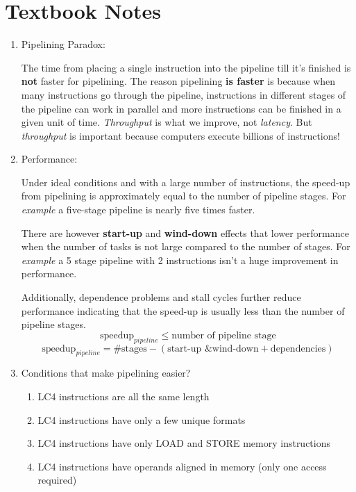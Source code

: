 \documentclass[12pt]{article}
\newenvironment{QandA}{\begin{enumerate}[label=\bfseries\alph*.]\bfseries}
                      {\end{enumerate}}
\newenvironment{answered}{\par\quad\normalfont}{}
\begin{document}
\section{Textbook Notes}
\begin{QandA}
   \item Pipelining Paradox:
   \begin{answered}
    The time from placing a single instruction into the pipeline till it's finished is \textbf{not} faster for pipelining. The reason pipelining \textbf{is faster} is because when many instructions go through the pipeline, instructions in different stages of the pipeline can work in parallel and more instructions can be finished in a given unit of time. \textit{Throughput} is what we improve, not \textit{latency}. But \textit{throughput} is important because computers execute billions of instructions!
   \end{answered}
   
   \item Performance:
   \begin{answered}
   Under ideal conditions and with a large number of instructions, the speed-up from pipelining is approximately equal to the number of pipeline stages. For \textit{example} a five-stage pipeline is nearly five times faster. 
   
   There are however \textbf{start-up} and \textbf{wind-down} effects that lower performance when the number of tasks is not large compared to the number of stages. For \textit{example} a 5 stage pipeline with 2 instructions isn't a huge improvement in performance. 
   
   Additionally, dependence problems and stall cycles further reduce performance indicating that the speed-up is usually less than the number of pipeline stages.
   \begin{equation*}
       \text{speedup}_{pipeline} \leq \text{number of pipeline stage}
   \end{equation*}
      \begin{equation*}
       \text{speedup}_{pipeline} = \text{\#stages} - (\text{start-up \& wind-down} + \text{dependencies})
   \end{equation*}
   \end{answered}
   
   \item Conditions that make pipelining easier?
   \begin{answered}
   \begin{enumerate}
       \item LC4 instructions are all the same length
       \item LC4 instructions have only a few unique formats
       \item LC4 instructions have only LOAD and STORE memory instructions
       \item LC4 instructions have operands aligned in memory (only one access required)
   \end{enumerate}
   \end{answered}
   

\end{QandA}
\end{document}
